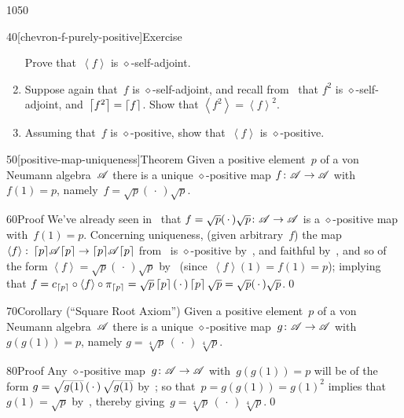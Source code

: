 \begin{parsec}{1050}
\begin{point}{40}[chevron-f-purely-positive]{Exercise}
\begin{enumerate}
Prove that~$\left<f\right>$
is $\diamond$-self-adjoint.
\item
Suppose again that~$f$ is $\diamond$-self-adjoint,
and recall from~ that $f^2$
is $\diamond$-self-adjoint, and~$\left\lceil f^2\right\rceil = \left\lceil f\right\rceil$.
Show that $\left<f^2\right> = \left<f\right>^2$.
\item
Assuming that~$f$ is $\diamond$-positive,
show that~$\left<f\right>$ is $\diamond$-positive.
\end{enumerate}
\spacingfix
\end{point}%
\begin{point}{50}[positive-map-uniqueness]{Theorem}%
Given a positive element~$p$ of a von Neumann algebra~$\mathscr{A}$
there is a unique $\diamond$-positive map $f\colon \mathscr{A}\to\mathscr{A}$
with~$f(1)=p$,
namely~$f=\sqrt{p}(\,\cdot\,)\sqrt{p}$.
\begin{point}{60}{Proof}%
We've already seen in~
that $f=\sqrt{p}(\,\cdot\,)\sqrt{p}\colon \mathscr{A}\to\mathscr{A}$
is a $\diamond$-positive map with~$f(1)=p$.
Concerning uniqueness,
(given arbitrary~$f$)
the map~$\left<f\right>\colon \left\lceil p\right\rceil\!\mathscr{A}\!\left\lceil p\right\rceil
\to \left\lceil p\right\rceil\!\mathscr{A}\!\left\lceil p\right\rceil$
from~
is $\diamond$-positive by~,
and faithful by~,
and so of the form
$\left<f\right>=\sqrt{p}(\,\cdot\,)\sqrt{p}$
by~
(since~$\left<f\right>\!(1)=f(1)=p$);
implying that
$f= c_{\left\lceil p\right\rceil}\circ\left<f\right>\circ \pi_{\left\lceil p\right\rceil}
= \sqrt{p}\left\lceil p\right\rceil(\,\cdot\,)\left\lceil p\right\rceil\sqrt{p}
= \sqrt{p}(\,\cdot\,)\sqrt{p}$.\qed
\end{point}
\end{point}
\begin{point}{70}{Corollary (``Square Root Axiom'')}%
Given a positive element~$p$ of a von Neumann algebra~$\mathscr{A}$
there is a unique $\diamond$-positive map~$g\colon \mathscr{A}\to\mathscr{A}$
with~$g(g(1))=p$, namely
$g=\sqrt[4]{p}\,(\,\cdot\,)\,\sqrt[4]{p}$.
\begin{point}{80}{Proof}%
Any $\diamond$-positive map~$g\colon \mathscr{A}\to\mathscr{A}$ with~$g(g(1))=p$
will be of the form
$g=\smash{\sqrt{g(1)}\,(\,\cdot\,)\,\sqrt{g(1)}}$
by~;
so that~$p=g(g(1))=g(1)^2$
implies that~$g(1)=\sqrt{p}$
by~,
thereby giving~$g=\sqrt[4]{p}\,(\,\cdot\,)\,\sqrt[4]{p}$.\qed
\end{point}
\end{point}
\end{parsec}
